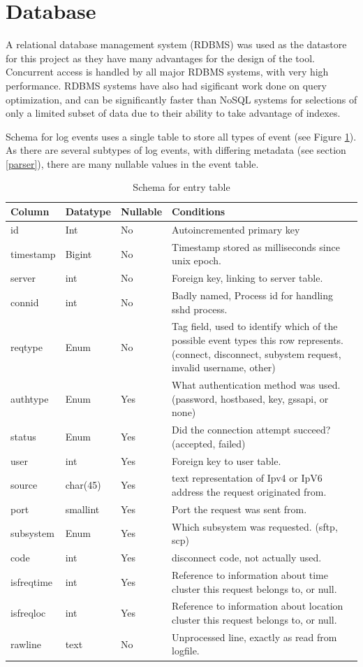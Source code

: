 \section{Database} 

A relational database management system (RDBMS) was used as the datastore for this project as they have many advantages for the design of the tool. Concurrent access is handled by all major RDBMS systems, with very high performance. RDBMS systems have also had sigificant work done on query optimization, and can be significantly faster than NoSQL systems for selections of only a limited subset of data due to their ability to take advantage of indexes.

Schema for log events uses a single table to store all types of event (see Figure \ref{entry_schema}). As there are several subtypes of log events, with differing metadata (see section \ref{parser}), there are many nullable values in the event table.
\begin{table}[tbh]
\centering
\begin{tabular}{l || l | l | p{}}
Column & Datatype & Nullable & Conditions \\ \hline
id & Int & No & Autoincremented primary key \\
timestamp & Bigint & No & Timestamp stored as milliseconds since unix epoch. \\
server & int & No & Foreign key, linking to server table. \\
connid & int & No & Badly named, Process id for handling sshd process. \\
reqtype & Enum & No & Tag field, used to identify which of the possible event types this row represents. (connect, disconnect, subystem request, invalid username, other) \\
authtype & Enum & Yes & What authentication method was used. (password, hostbased, key, gssapi, or none) \\
status & Enum & Yes & Did the connection attempt succeed? (accepted, failed) \\
user & int & Yes & Foreign key to user table. \\
source & char(45) & Yes & text representation of Ipv4 or IpV6 address the request originated from. \\
port & smallint & Yes & Port the request was sent from. \\
subsystem & Enum & Yes & Which subsystem was requested. (sftp, scp) \\
code & int & Yes & disconnect code, not actually used. \\
isfreqtime & int & Yes & Reference to information about time cluster this request belongs to, or null. \\
isfreqloc & int & Yes & Reference to information about location cluster this request belongs to, or null. \\
rawline & text & No & Unprocessed line, exactly as read from logfile. \\
\end {tabular}
\caption{Schema for entry table}
\label{entry_schema}
\end{table}


